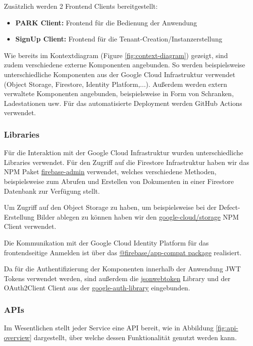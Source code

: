 Zusätzlich werden 2 Frontend Clients bereitgestellt:

\begin{itemize}
    \item \textbf{PARK Client:} Frontend für die Bedienung der Anwendung
    \item \textbf{SignUp Client:} Frontend für die Tenant-Creation/Instanzerstellung
\end{itemize}

Wie bereits im Kontextdiagram (Figure \ref{fig:context-diagram}) gezeigt, sind zudem verschiedene externe Komponenten angebunden. So werden beispielsweise unterschiedliche Komponenten aus der Google Cloud Infrastruktur verwendet (Object Storage, Firestore, Identity Platform,...). Außerdem werden extern verwaltete Komponenten angebunden, beispielsweise in Form von Schranken, Ladestationen usw. Für das automatisierte Deployment werden GitHub Actions verwendet.

\subsubsection{Libraries}
Für die Interaktion mit der Google Cloud Infrastruktur wurden unterschiedliche Libraries verwendet. Für den Zugriff auf die Firestore Infrastruktur haben wir das NPM Paket \href{hhttps://www.npmjs.com/package/firebase-admin}{firebase-admin} verwendet, welches verschiedene Methoden, beispielsweise zum Abrufen und Erstellen von Dokumenten in einer Firestore Datenbank zur Verfügung stellt.

Um Zugriff auf den Object Storage zu haben, um beispielsweise bei der Defect-Erstellung Bilder ablegen zu können haben wir den \href{https://www.npmjs.com/package/@google-cloud/storage}{google-cloud/storage} NPM Client verwendet.

Die Kommunikation mit der Google Cloud Identity Platform für das frontendseitige Anmelden ist über das \href{https://www.npmjs.com/package/@firebase/app-compat}{@firebase/app-compat package} realisiert.

Da für die Authentifizierung der Komponenten innerhalb der Anwendung JWT Tokens verwendet werden, sind außerdem die \href{https://www.npmjs.com/package/jsonwebtoken}{jsonwebtoken} Library und der OAuth2Client Client aus der \href{https://www.npmjs.com/package/google-auth-library}{google-auth-library} eingebunden.

\subsubsection{APIs}
Im Wesentlichen stellt jeder Service eine API bereit, wie in Abbildung \ref{fig:api-overview} dargestellt, über welche dessen Funktionalität genutzt werden kann.

